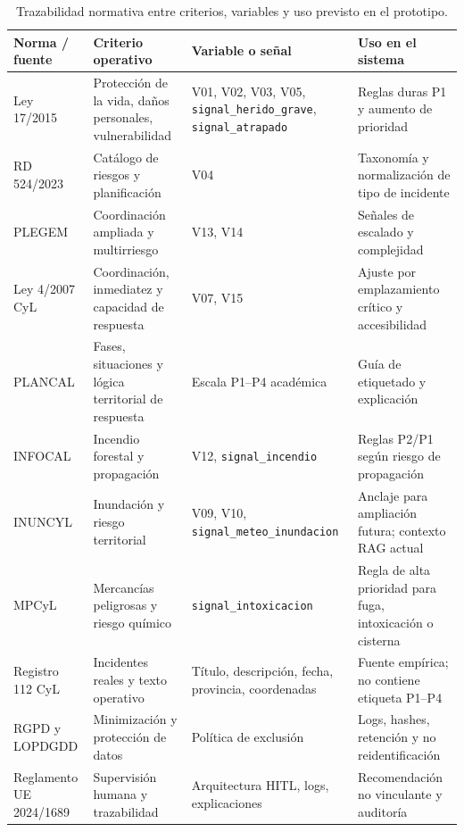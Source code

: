 \begin{table}[htbp]
\centering
\scriptsize
\begin{tabular}{|p{3.1cm}|p{3.2cm}|p{3.5cm}|p{3.2cm}|}
\hline
\textbf{Norma / fuente} & \textbf{Criterio operativo} & \textbf{Variable o señal} & \textbf{Uso en el sistema} \\ \hline
Ley 17/2015 & Protección de la vida, daños personales, vulnerabilidad & V01, V02, V03, V05, \texttt{signal\_herido\_grave}, \texttt{signal\_atrapado} & Reglas duras P1 y aumento de prioridad \\ \hline
RD 524/2023 & Catálogo de riesgos y planificación & V04 & Taxonomía y normalización de tipo de incidente \\ \hline
PLEGEM & Coordinación ampliada y multirriesgo & V13, V14 & Señales de escalado y complejidad \\ \hline
Ley 4/2007 CyL & Coordinación, inmediatez y capacidad de respuesta & V07, V15 & Ajuste por emplazamiento crítico y accesibilidad \\ \hline
PLANCAL & Fases, situaciones y lógica territorial de respuesta & Escala P1--P4 académica & Guía de etiquetado y explicación \\ \hline
INFOCAL & Incendio forestal y propagación & V12, \texttt{signal\_incendio} & Reglas P2/P1 según riesgo de propagación \\ \hline
INUNCYL & Inundación y riesgo territorial & V09, V10, \texttt{signal\_meteo\_inundacion} & Anclaje para ampliación futura; contexto RAG actual \\ \hline
MPCyL & Mercancías peligrosas y riesgo químico & \texttt{signal\_intoxicacion} & Regla de alta prioridad para fuga, intoxicación o cisterna \\ \hline
Registro 112 CyL & Incidentes reales y texto operativo & Título, descripción, fecha, provincia, coordenadas & Fuente empírica; no contiene etiqueta P1--P4 \\ \hline
RGPD y LOPDGDD & Minimización y protección de datos & Política de exclusión & Logs, hashes, retención y no reidentificación \\ \hline
Reglamento UE 2024/1689 & Supervisión humana y trazabilidad & Arquitectura HITL, logs, explicaciones & Recomendación no vinculante y auditoría \\ \hline
\end{tabular}
\caption{Trazabilidad normativa entre criterios, variables y uso previsto en el prototipo.}
\label{tab:cap3_trazabilidad}
\end{table}

